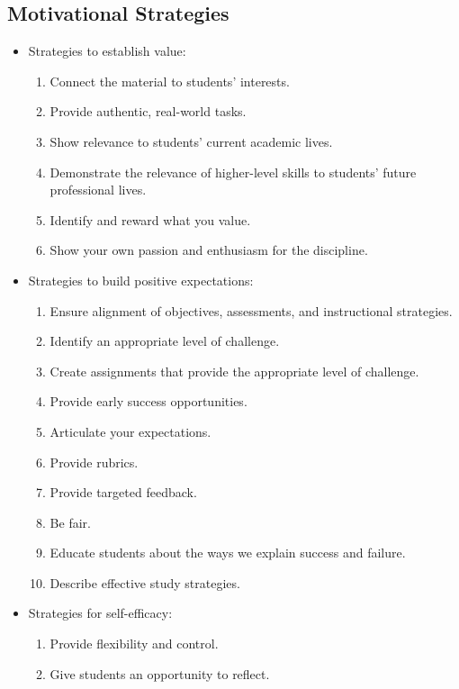 \subsection{Motivational Strategies}\label{motivational-strategies}

\begin{itemize}
\itemsep1pt\parskip0pt
\item
  Strategies to establish value:

  \begin{enumerate}
  \def\labelenumi{\arabic{enumi}.}
  \itemsep1pt\parskip0pt
  \item
    Connect the material to students' interests.
  \item
    Provide authentic, real-world tasks.
  \item
    Show relevance to students' current academic lives.
  \item
    Demonstrate the relevance of higher-level skills to students' future
    professional lives.
  \item
    Identify and reward what you value.
  \item
    Show your own passion and enthusiasm for the discipline.
  \end{enumerate}
\item
  Strategies to build positive expectations:

  \begin{enumerate}
  \def\labelenumi{\arabic{enumi}.}
  \itemsep1pt\parskip0pt
  \item
    Ensure alignment of objectives, assessments, and instructional
    strategies.
  \item
    Identify an appropriate level of challenge.
  \item
    Create assignments that provide the appropriate level of challenge.
  \item
    Provide early success opportunities.
  \item
    Articulate your expectations.
  \item
    Provide rubrics.
  \item
    Provide targeted feedback.
  \item
    Be fair.
  \item
    Educate students about the ways we explain success and failure.
  \item
    Describe effective study strategies.
  \end{enumerate}
\item
  Strategies for self-efficacy:

  \begin{enumerate}
  \def\labelenumi{\arabic{enumi}.}
  \itemsep1pt\parskip0pt
  \item
    Provide flexibility and control.
  \item
    Give students an opportunity to reflect.
  \end{enumerate}
\end{itemize}


